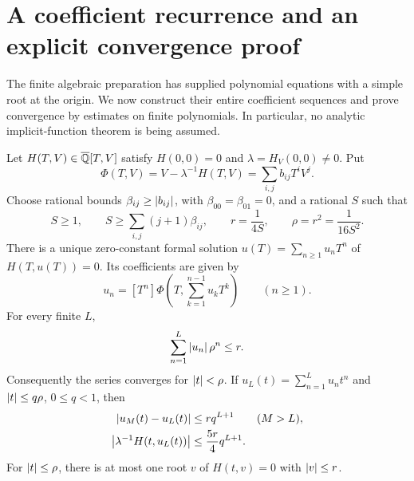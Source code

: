 \section{A coefficient recurrence and an explicit convergence proof}
\label{sec:analytic}

The finite algebraic preparation has supplied polynomial equations with a
simple root at the origin. We now construct their entire coefficient sequences
and prove convergence by estimates on finite polynomials. In particular, no
analytic implicit-function theorem is being assumed.

\begin{lemma}\label{lem:analytic}
Let $H(T,V)\in\overline{\mathbb Q}[T,V]$ satisfy
$H(0,0)=0$ and $\lambda=H_V(0,0)\ne0$. Put
\[
 \Phi(T,V)=V-\lambda^{-1}H(T,V)=\sum_{i,j}b_{ij}T^iV^j.
\]
Choose rational bounds $\beta_{ij}\ge\left|b_{ij}\right|$, with
$\beta_{00}=\beta_{01}=0$, and a rational $S$ such that
\begin{equation}
 S\ge1,\qquad S\ge\sum_{i,j}(j+1)\beta_{ij},\qquad
 r=\frac1{4S},\qquad \rho=r^2=\frac1{16S^2}.
 \label{eq:radius}
\end{equation}
There is a unique zero-constant formal solution
$u(T)=\sum_{n\ge1}u_nT^n$ of $H(T,u(T))=0$. Its coefficients are given by
\begin{equation}
 u_n=[T^n]\Phi\left(T,\sum_{k=1}^{n-1}u_kT^k\right)
 \qquad(n\ge1).
 \label{eq:implicit-recursion}
\end{equation}
For every finite $L$,
\begin{equation}
 \sum_{n=1}^{L}\left|u_n\right|\rho^n\le r.
 \label{eq:weighted}
\end{equation}
Consequently the series converges for $\left|t\right|<\rho$. If
$u_L(t)=\sum_{n=1}^{L}u_nt^n$ and $\left|t\right|\le q\rho$, $0\le q<1$, then
\begin{align}
 \left|u_M(t)-u_L(t)\right|&\le r q^{L+1} &&(M>L),\\
 \left|\lambda^{-1}H(t,u_L(t))\right|
       &\le\frac{5r}{4}q^{L+1}.\label{eq:residual}
\end{align}
For $\left|t\right|\le\rho$, there is at most one root $v$ of $H(t,v)=0$
with $\left|v\right|\le r$.
\end{lemma}

